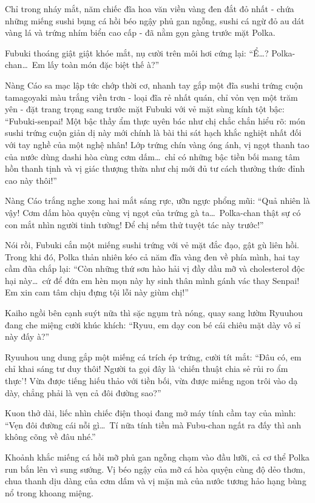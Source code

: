 \documentclass[../main.tex]{subfiles}
\begin{document}
Chỉ trong nháy mắt, năm chiếc đĩa hoa văn viền vàng đen đắt đỏ nhất - chứa những miếng sushi bụng cá hồi béo ngậy phủ gan ngỗng, sushi cá ngừ đỏ au dát vàng lá và trứng nhím biển cao cấp - đã nằm gọn gàng trước mặt Polka.

Fubuki thoáng giật giật khóe mắt, nụ cười trên môi hơi cứng lại: ``Ể\dots? Polka-chan\dots\ Em lấy toàn món đặc biệt thế à?''

Nàng Cáo sa mạc lập tức chớp thời cơ, nhanh tay gắp một đĩa sushi trứng cuộn tamagoyaki màu trắng viền trơn - loại đĩa rẻ nhất quán, chỉ vỏn vẹn một trăm yên - đặt trang trọng sang trước mặt Fubuki với vẻ mặt sùng kính tột bậc: ``Fubuki-senpai! Một bậc thầy ẩm thực uyên bác như chị chắc chắn hiểu rõ: món sushi trứng cuộn giản dị này mới chính là bài thi sát hạch khắc nghiệt nhất đối với tay nghề của một nghệ nhân! Lớp trứng chín vàng óng ánh, vị ngọt thanh tao của nước dùng dashi hòa cùng cơm dấm\dots\ chỉ có những bậc tiền bối mang tâm hồn thanh tịnh và vị giác thượng thừa như chị mới đủ tư cách thưởng thức đỉnh cao này thôi!''

Nàng Cáo trắng nghe xong hai mắt sáng rực, ưỡn ngực phổng mũi: ``Quả nhiên là vậy! Cơm dấm hòa quyện cùng vị ngọt của trứng gà ta\dots\ Polka-chan thật sự có con mắt nhìn người tinh tường! Để chị nếm thử tuyệt tác này trước!''

Nói rồi, Fubuki cắn một miếng sushi trứng với vẻ mặt đắc đạo, gật gù liên hồi. Trong khi đó, Polka thản nhiên kéo cả năm đĩa vàng đen về phía mình, hai tay cầm đũa chắp lại: ``Còn những thứ sơn hào hải vị đầy dầu mỡ và cholesterol độc hại này\dots\ cứ để đứa em hèn mọn này hy sinh thân mình gánh vác thay Senpai! Em xin cam tâm chịu đựng tội lỗi này giùm chị!''

Kaiho ngồi bên cạnh suýt nữa thì sặc ngụm trà nóng, quay sang lườm Ryuuhou đang che miệng cười khúc khích: ``Ryuu, em dạy con bé cái chiêu mặt dày vô sỉ này đấy à?''

Ryuuhou ung dung gắp một miếng cá trích ép trứng, cười tít mắt: ``Đâu có, em chỉ khai sáng tư duy thôi! Người ta gọi đây là `chiến thuật chia sẻ rủi ro ẩm thực'! Vừa được tiếng hiếu thảo với tiền bối, vừa được miếng ngon trôi vào dạ dày, chẳng phải là vẹn cả đôi đường sao?''

Kuon thở dài, liếc nhìn chiếc điện thoại đang mở máy tính cầm tay của mình: ``Vẹn đôi đường cái nỗi gì\dots\ Tí nữa tính tiền mà Fubu-chan ngất ra đấy thì anh không cõng về đâu nhé.''

Khoảnh khắc miếng cá hồi mỡ phủ gan ngỗng chạm vào đầu lưỡi, cả cơ thể Polka run bắn lên vì sung sướng. Vị béo ngậy của mỡ cá hòa quyện cùng độ dẻo thơm, chua thanh dịu dàng của cơm dấm và vị mặn mà của nước tương hảo hạng bùng nổ trong khoang miệng.
\end{document}
